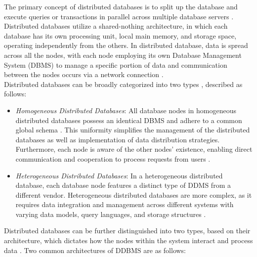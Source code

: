 \noindent The primary concept of distributed databases is to split up the database and execute queries or transactions in parallel across multiple database servers \cite{ramakrishnan2003database, rahimi2010distributed}. Distributed databases utilize a shared-nothing architecture, in which each database has its own processing unit, local main memory, and storage space, operating independently from the others. In distributed database, data is spread across all the nodes, with each node employing its own Database Management System (DBMS) to manage a specific portion of data and communication between the nodes occurs via a network connection \cite{coronel2016database}. \\

\noindent Distributed databases can be broadly categorized into two types \cite{ozsu1999principles}, described as follows: 
\begin{itemize}
\item[-] \emph{Homogeneous Distributed Databases}: All database nodes in homogeneous distributed databases possess an identical DBMS and adhere to a common global schema \cite{ozsu1999principles, silberschatz2011database}. This uniformity simplifies the management of the distributed databases as well as implementation of data distribution strategies. Furthermore, each node is aware of the other nodes’ existence, enabling direct communication and cooperation to process requests from users \cite{silberschatz2011database}.

\item[-] \emph{Heterogeneous Distributed Databases}: In a heterogeneous distributed database, each database node features a distinct type of DDMS from a different vendor. Heterogeneous distributed databases are more complex, as it requires data integration and management across different systems with varying data models, query languages, and storage structures \cite{ozsu1999principles, silberschatz2011database}.
\end{itemize}

\noindent Distributed databases can be further distinguished into two types, based on their architecture, which dictates how the nodes within the system interact and process data \cite{ozsu1999principles, silberschatz2011database, abdelhafiz2020distributed}. Two common architectures of DDBMS are as follows:

